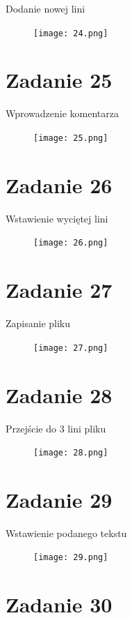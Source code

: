 \documentclass[fleqn,onecolumn,a4paper,12pt,titlepage]{article}
\begin{document}
Dodanie nowej lini
\begin{figure}[H]%
    \centering\texttt{[image: 24.png]}
\end{figure}

\section*{Zadanie 25}

Wprowadzenie komentarza
\begin{figure}[H]%
    \centering\texttt{[image: 25.png]}
\end{figure}

\section*{Zadanie 26}

Wstawienie wyciętej lini
\begin{figure}[H]%
    \centering\texttt{[image: 26.png]}
\end{figure}

\section*{Zadanie 27}

Zapisanie pliku
\begin{figure}[H]%
    \centering\texttt{[image: 27.png]}
\end{figure}

\section*{Zadanie 28}

Przejście do 3 lini pliku
\begin{figure}[H]%
    \centering\texttt{[image: 28.png]}
\end{figure}

\section*{Zadanie 29}

Wstawienie podanego tekstu
\begin{figure}[H]%
    \centering\texttt{[image: 29.png]}
\end{figure}

\section*{Zadanie 30}
\end{document}

